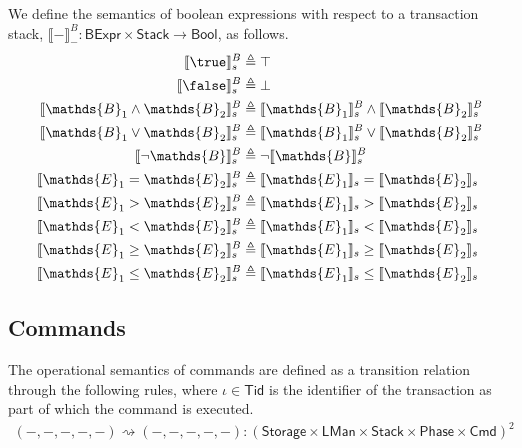 We define the semantics of boolean expressions with respect to a transaction stack, $\llbracket - \rrbracket_-^B : \mathsf{BExpr} \times \mathsf{Stack} \rightarrow \mathsf{Bool}$, as follows.
\begin{align*}
\llbracket \true \rrbracket_s^B &\triangleq \top \\
\llbracket \false \rrbracket_s^B &\triangleq \bot \\
\llbracket \mathds{B}_1 \land \mathds{B}_2 \rrbracket_s^B &\triangleq \llbracket \mathds{B}_1 \rrbracket_s^B \land \llbracket \mathds{B}_2 \rrbracket_s^B \\
\llbracket \mathds{B}_1 \lor \mathds{B}_2 \rrbracket_s^B &\triangleq \llbracket \mathds{B}_1 \rrbracket_s^B \lor \llbracket \mathds{B}_2 \rrbracket_s^B \\
\llbracket \lnot \mathds{B} \rrbracket_s^B &\triangleq \lnot \llbracket \mathds{B} \rrbracket_s^B \\
\llbracket \mathds{E}_1 = \mathds{E}_2 \rrbracket_s^B &\triangleq \llbracket \mathds{E}_1 \rrbracket_s = \llbracket \mathds{E}_2 \rrbracket_s \\
\llbracket \mathds{E}_1 > \mathds{E}_2 \rrbracket_s^B &\triangleq \llbracket \mathds{E}_1 \rrbracket_s > \llbracket \mathds{E}_2 \rrbracket_s \\
\llbracket \mathds{E}_1 < \mathds{E}_2 \rrbracket_s^B &\triangleq \llbracket \mathds{E}_1 \rrbracket_s < \llbracket \mathds{E}_2 \rrbracket_s \\
\llbracket \mathds{E}_1 \geq \mathds{E}_2 \rrbracket_s^B &\triangleq \llbracket \mathds{E}_1 \rrbracket_s \geq \llbracket \mathds{E}_2 \rrbracket_s \\
\llbracket \mathds{E}_1 \leq \mathds{E}_2 \rrbracket_s^B &\triangleq \llbracket \mathds{E}_1 \rrbracket_s \leq \llbracket \mathds{E}_2 \rrbracket_s \\
\end{align*}

\subsection{Commands}

The operational semantics of commands are defined as a transition relation through the following rules, where $\iota \in \mathsf{Tid}$ is the identifier of the transaction as part of which the command is executed.
\begin{gather*}
(-, -, -, -, -) \rightsquigarrow (-, -, -, -, -) 
: (\mathsf{Storage} \times \mathsf{LMan} \times \mathsf{Stack} \times \mathsf{Phase} \times \mathsf{Cmd})^2
\end{gather*}

